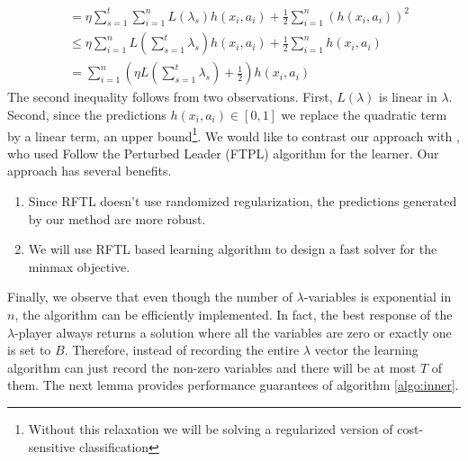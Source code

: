 \documentclass{article}
\newcommand{\kibitz}[2]{\ifnum\Comments=1{\color{#1}{#2}}\fi}
\newcommand{\dm}[1]{\kibitz{magenta}{[Deb: #1]}}
\newcommand{\set}[1]{\{#1\}}
\newcommand{\bbR}{\mathbb{R}}
\newcommand{\WW}{\mathcal{W}}
\newcommand{\abs}[1]{\left|#1\right|}
\newcommand{\Ac}{\mathcal{A}}
\newcommand{\HH}{\mathcal{H}}
\newcommand{\norm}[1]{\lVert #1 \rVert}
\begin{document}
\begin{align*}
&= \eta \sum_{s=1}^t \sum_{i=1}^n L(\lambda_s) h(x_i,a_i) + \frac{1}{2} \sum_{i=1}^n (h(x_i,a_i))^2 \\
&\le \eta \sum_{i=1}^n L\left(\sum_{s=1}^t \lambda_s\right) h(x_i,a_i) + \frac{1}{2} \sum_{i=1}^n h(x_i,a_i) \\
&= \sum_{i=1}^n \left(\eta L\left(\sum_{s=1}^t \lambda_s\right) + \frac{1}{2}\right) h(x_i,a_i)
\end{align*}
The second inequality follows from two observations. First, $L(\lambda)$ is linear in $\lambda$. Second, since the predictions $h(x_i,a_i) \in [0,1]$ we replace the quadratic term by a linear term, an upper bound\footnote{Without this relaxation we will be solving a regularized version of cost-sensitive classification}. We would like to contrast our approach with \cite{KNRZ17}, who used Follow the Perturbed Leader (FTPL) algorithm for the learner. Our approach has several benefits.
\begin{enumerate}
\item Since RFTL doesn't use randomized regularization, the predictions generated by our method are more robust. \dm{Rephrase.}
\item We will use RFTL based learning algorithm to design a fast solver for the minmax objective.
\end{enumerate}
Finally, we observe that even though the number of $\lambda$-variables is exponential in $n$, the algorithm can be efficiently implemented. In fact, the best response of the $\lambda$-player always returns a solution where all the variables are zero or exactly one is set to $B$. Therefore, instead of recording the entire $\lambda$ vector the learning algorithm can just record the non-zero variables and there will be at most $T$ of them. The next lemma provides performance guarantees of algorithm \ref{algo:inner}.
\end{document}
